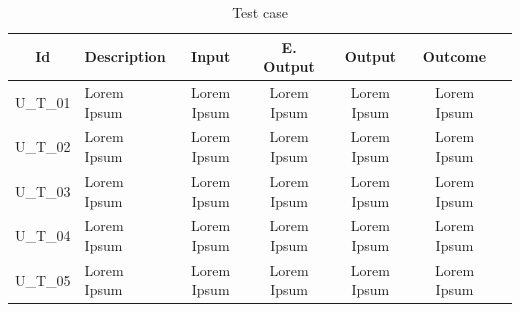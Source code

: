 \begin{table}[ht!]
    \centering
    \caption{Test case}
    \begin{tabularx}{\textwidth}{|Sl|S{X}|S{X}|S{X}|S{X}|S{X}|}
        \hline
        \textbf{Id} & \textbf{Description} & \textbf{Input} & \textbf{E. Output} & \textbf{Output} & \textbf{Outcome} \\ \hline
        U\_T\_01    & Lorem Ipsum          & Lorem Ipsum    & Lorem Ipsum         & Lorem Ipsum     & Lorem Ipsum      \\ \hline
        U\_T\_02    & Lorem Ipsum          & Lorem Ipsum    & Lorem Ipsum         & Lorem Ipsum     & Lorem Ipsum      \\ \hline
        U\_T\_03    & Lorem Ipsum          & Lorem Ipsum    & Lorem Ipsum         & Lorem Ipsum     & Lorem Ipsum      \\ \hline
        U\_T\_04    & Lorem Ipsum          & Lorem Ipsum    & Lorem Ipsum         & Lorem Ipsum     & Lorem Ipsum      \\ \hline
        U\_T\_05    & Lorem Ipsum          & Lorem Ipsum    & Lorem Ipsum         & Lorem Ipsum     & Lorem Ipsum      \\ \hline
    \end{tabularx}
\end{table}

